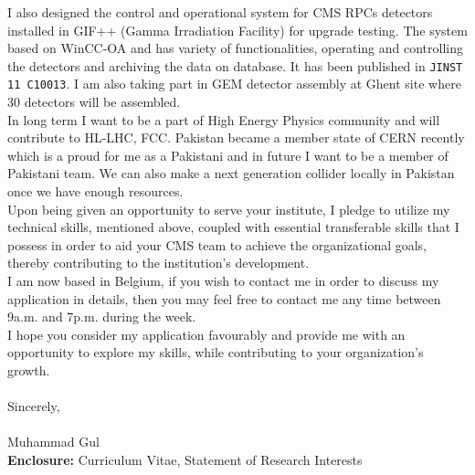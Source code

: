 \documentclass[]{article}
\begin{document}
\noindent I also designed the control and operational system for CMS RPCs detectors installed in GIF++ (Gamma Irradiation Facility) for upgrade testing. The system based on WinCC-OA and has variety of functionalities, operating and controlling the detectors and archiving the data on database. It has been published in \texttt{JINST 11 C10013}. I am also taking part in GEM detector assembly at Ghent site where 30 detectors will be assembled.\\

\noindent In long term I want to be a part of High Energy Physics community and will contribute to HL-LHC, FCC. Pakistan became a member state of CERN recently which is a proud for me as a Pakistani and in future I want to be a member of Pakistani team. We can also make a next generation collider locally in Pakistan once we have enough resources.  \\   

\noindent Upon being given an opportunity to serve your institute, I pledge to utilize my technical skills, mentioned above, coupled with essential transferable skills that I possess in order to aid your CMS team to achieve the organizational goals, thereby contributing to the institution’s development.\\

\noindent I am now based in Belgium, if you wish to contact me in order to discuss my application in details, then you may feel free to contact me any time between 9a.m. and 7p.m. during the week.\\
\noindent I hope you consider my application favourably and provide me with an opportunity to explore my skills, while contributing to your organization's growth. 
\\
\\
Sincerely,\\
\\
Muhammad Gul\\

\noindent \textbf{Enclosure:} Curriculum Vitae, Statement of Research Interests 
\end{document}
